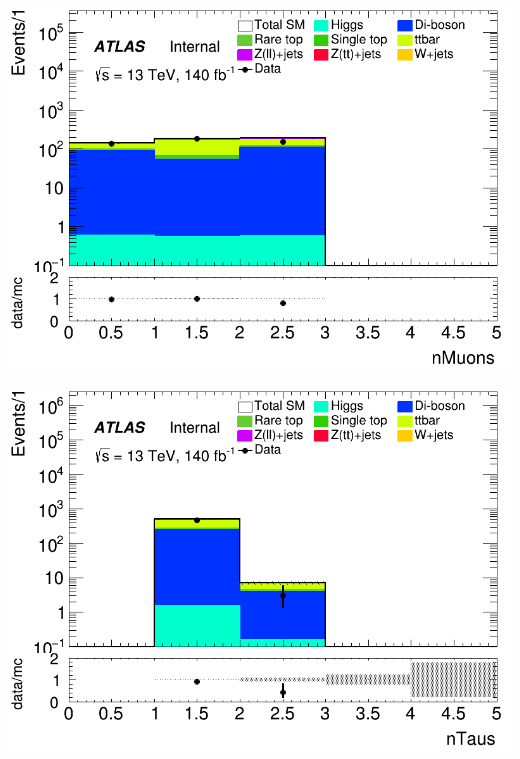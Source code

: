 \documentclass[usenames,dvipsnames]{beamer}
\begin{document}
\begin{frame}
    \begin{minipage}{0.32\textwidth}
        \centering
        \includegraphics[width=\textwidth]{graphics/LLH_met/LLH_met_nMuons.png}
    \end{minipage}
    \hfill
    \begin{minipage}{0.32\textwidth}
        \centering
        \includegraphics[width=\textwidth]{graphics/LLH_met/LLH_met_nTaus.png}
    \end{minipage}
    \hfill
    \begin{minipage}{0.32\textwidth}
        \centering

\end{minipage}
\end{frame}
\end{document}
